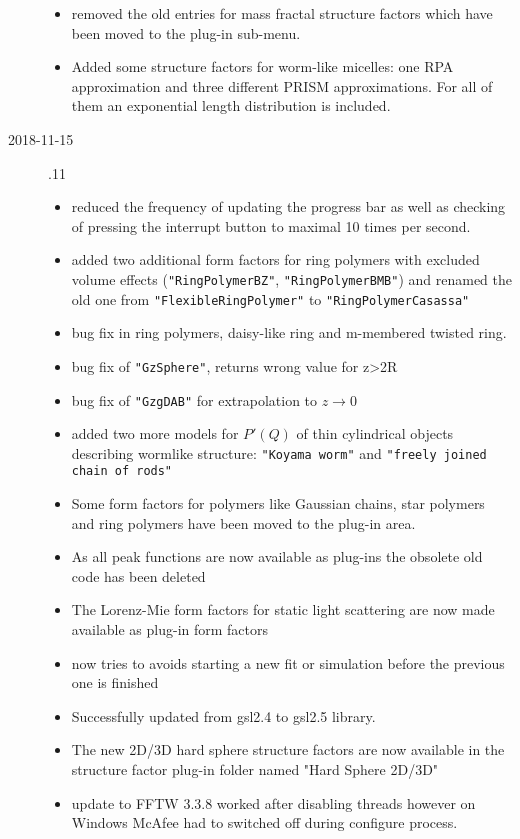 \begin{description}
\begin{itemize}
    \item  removed the old entries for mass fractal structure factors which have been moved to the plug-in sub-menu.
    \item Added some structure factors for worm-like micelles: one RPA approximation and three different PRISM approximations. For all of them an exponential length distribution is included.
    \end{itemize}
\item[2018-11-15] .11
    \begin{itemize}
    \item reduced the frequency of updating the progress bar as well as checking of pressing the interrupt button to maximal 10 times per second.
    \item added two additional form factors for ring polymers with excluded volume effects (\texttt{"RingPolymerBZ"}, \texttt{"RingPolymerBMB"}) and renamed the old one from \texttt{"FlexibleRingPolymer"} to \texttt{"RingPolymerCasassa"}
    \item bug fix in ring polymers, daisy-like ring and m-membered twisted ring.
    \item bug fix of \texttt{"GzSphere"}, returns wrong value for z>2R
    \item bug fix of \texttt{"GzgDAB"} for extrapolation to $z\rightarrow 0$
    \item added two more models for $P'(Q)$ of thin cylindrical objects describing wormlike structure: \texttt{"Koyama worm"} and \texttt{"freely joined chain of rods"}
    \item Some form factors for polymers like Gaussian chains, star polymers and ring polymers have been moved to the plug-in area.
    \item As all peak functions are now available as plug-ins the obsolete old code has been deleted
    \item The Lorenz-Mie form factors for static light scattering are now made available as plug-in form factors
    \item \SASfit now tries to avoids starting a new fit or simulation before the previous one is finished
    \item Successfully updated from gsl2.4 to gsl2.5 library.
    \item The new 2D/3D hard sphere structure factors are now available in the structure factor plug-in folder named "Hard Sphere 2D/3D"
    \item update to FFTW 3.3.8 worked after disabling threads however on Windows McAfee had to switched off during configure process.

\end{itemize}
\end{description}
